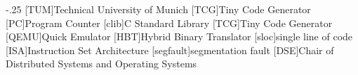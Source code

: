 \documentclass[headsepline,footsepline,footinclude=false,oneside,fontsize=11pt,paper=a4,listof=totoc,bibliography=totoc]{scrbook} %
\begin{document}


\frontmatter{}





\tableofcontents{}

\mainmatter{}












%


\appendix{}


\begin{acronym}
	\itemsep-.25\baselineskip
	[TUM]{Technical University of Munich}
	[TCG]{Tiny Code Generator}
	[PC]{Program Counter}
	[clib]{C Standard Library}
	[TCG]{Tiny Code Generator}
	[QEMU]{Quick Emulator}
	[HBT]{Hybrid Binary Translator}
	[sloc]{single line of code}
	[ISA]{Instruction Set Architecture}
	[segfault]{segmentation fault}
	[DSE]{Chair of Distributed Systems and Operating Systems}
\end{acronym}

\listoffigures{}
\listoftables{}
\printbibliography{}
\end{document}
